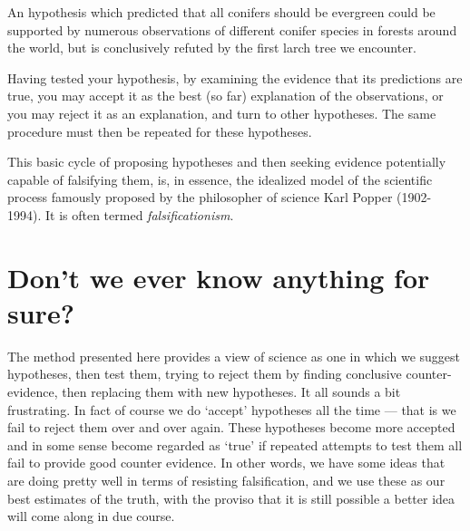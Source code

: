 \documentclass[]{book}
\begin{document}
An hypothesis which predicted that all conifers should be evergreen
could be supported by numerous observations of different conifer species
in forests around the world, but is conclusively refuted by the first
larch tree we encounter.

Having tested your hypothesis, by examining the evidence that its
predictions are true, you may accept it as the best (so far) explanation
of the observations, or you may reject it as an explanation, and turn to
other hypotheses. The same procedure must then be repeated for these
hypotheses.

This basic cycle of proposing hypotheses and then seeking evidence
potentially capable of falsifying them, is, in essence, the idealized
model of the scientific process famously proposed by the philosopher of
science Karl Popper (1902-1994). It is often termed
\emph{falsificationism}.

\section{Don't we ever know anything for sure?}\label{are-we-sure}

The method presented here provides a view of science as one in which we
suggest hypotheses, then test them, trying to reject them by finding
conclusive counter-evidence, then replacing them with new hypotheses. It
all sounds a bit frustrating. In fact of course we do `accept'
hypotheses all the time --- that is we fail to reject them over and over
again. These hypotheses become more accepted and in some sense become
regarded as `true' if repeated attempts to test them all fail to provide
good counter evidence. In other words, we have some ideas that are doing
pretty well in terms of resisting falsification, and we use these as our
best estimates of the truth, with the proviso that it is still possible
a better idea will come along in due course.
\end{document}
